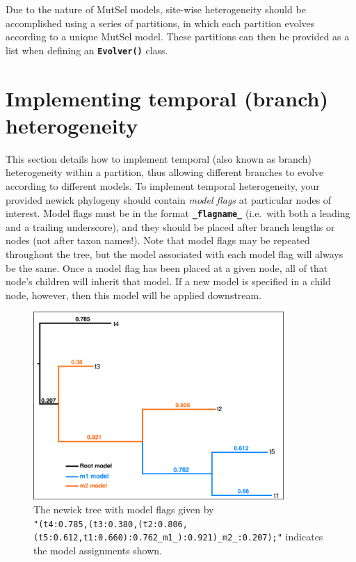 \documentclass{article}
\newcommand{\code}[1]{\textbf{\texttt{\small{#1}}}}
\begin{document}
Due to the nature of MutSel models, site-wise heterogeneity should be accomplished using a series of partitions, in which each partition evolves according to a unique MutSel model. These partitions can then be provided as a list when defining an \code{Evolver()} class.


\section{Implementing temporal (branch) heterogeneity}\label{sec:temphet}

This section details how to implement temporal (also known as branch) heterogeneity within a partition, thus allowing different branches to evolve according to different models. To implement temporal heterogeneity, your provided newick phylogeny should contain \emph{model flags} at particular nodes of interest. Model flags must be in the format \code{\_flagname\_} (i.e.\ with both a leading and a trailing underscore), and they should be placed after branch lengths or nodes (not after taxon names!). Note that model flags may be repeated throughout the tree, but the model associated with each model flag will always be the same. Once a model flag has been placed at a given node, all of that node's children will inherit that model. If a new model is specified in a child node, however, then this model will be applied downstream.

\begin{figure}[htpb]%
	\includegraphics[width=3.75in]{treeflags.pdf}
	\caption{\label{fig:treeflags} The newick tree with model flags given by \\ \texttt{\scriptsize{"(t4:0.785,(t3:0.380,(t2:0.806,(t5:0.612,t1:0.660):0.762\_m1\_):0.921)\_m2\_:0.207);"}}
		indicates the model assignments shown.}
\end{figure}
\end{document}
